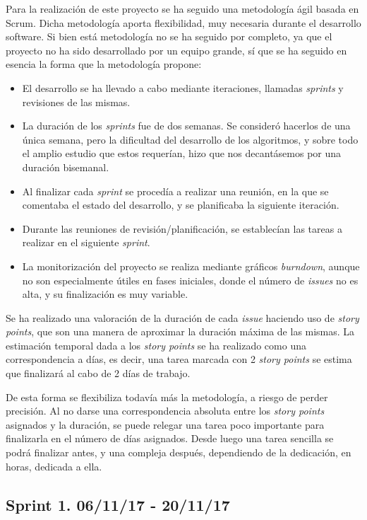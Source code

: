 Para la realización de este proyecto se ha seguido una metodología ágil basada en Scrum. Dicha metodología aporta flexibilidad, muy necesaria durante el desarrollo software. 
Si bien está metodología no se ha seguido por completo, ya que el proyecto no ha sido desarrollado por un equipo grande, sí que se ha seguido en esencia la forma que la metodología propone:
\begin{itemize}
\item El desarrollo se ha llevado a cabo mediante iteraciones, llamadas \emph{sprints} y revisiones de las mismas.
\item La duración de los \emph{sprints} fue de dos semanas. Se consideró hacerlos de una única semana, pero la dificultad del desarrollo de los algoritmos, y sobre todo el amplio estudio que estos requerían,  hizo que nos decantásemos por una duración bisemanal.
\item Al finalizar cada \emph{sprint} se procedía a realizar una reunión, en la que se comentaba el estado del desarrollo, y se planificaba la siguiente iteración. 
\item Durante las reuniones de revisión/planificación, se establecían las tareas a realizar en el siguiente \emph{sprint}.
\item La monitorización del proyecto se realiza mediante gráficos \emph{burndown}, aunque no son especialmente útiles en fases iniciales, donde el número de \emph{issues} no es alta, y su finalización es muy variable.
\end{itemize}

Se ha realizado una valoración de la duración de cada \emph{issue} haciendo uso de \emph{story points}, que son una manera de aproximar la duración máxima de las mismas.
La estimación temporal dada a los \emph{story points} se ha realizado como una correspondencia a días, es decir, una tarea marcada con 2 \emph{story points} se estima que finalizará al cabo de 2 días de trabajo.

De esta forma se flexibiliza todavía más la metodología, a riesgo de perder precisión. Al no darse una correspondencia absoluta entre los \emph{story points} asignados y la duración, se puede relegar una tarea poco importante para finalizarla en el número de días asignados. Desde luego una tarea sencilla se podrá finalizar antes, y una compleja después, dependiendo de la dedicación, en horas, dedicada a ella.


\subsection{Sprint 1. 06/11/17 - 20/11/17}

